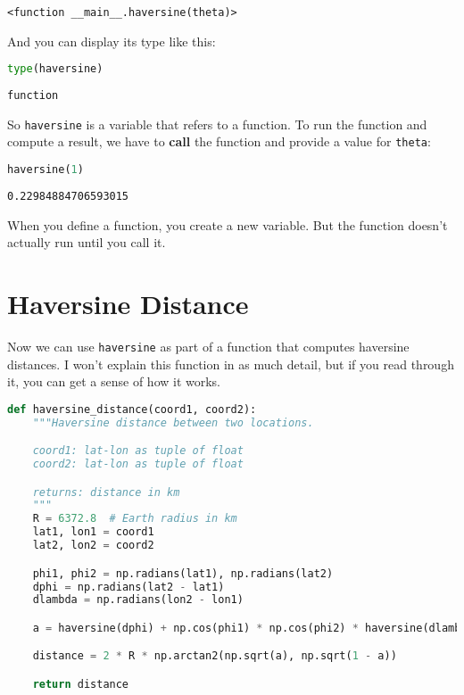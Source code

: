 \begin{lstlisting}[style=output]
<function __main__.haversine(theta)>
\end{lstlisting}

And you can display its type like this:

\begin{lstlisting}[language=Python,style=source]
type(haversine)
\end{lstlisting}

\begin{lstlisting}[style=output]
function
\end{lstlisting}

So \passthrough{\lstinline!haversine!} is a variable that refers to a
function. To run the function and compute a result, we have to
\textbf{call} the function and provide a value for
\passthrough{\lstinline!theta!}:

\begin{lstlisting}[language=Python,style=source]
haversine(1)
\end{lstlisting}

\begin{lstlisting}[style=output]
0.22984884706593015
\end{lstlisting}

When you define a function, you create a new variable. But the function
doesn't actually run until you call it.

\section{Haversine Distance}\label{haversine-distance}

Now we can use \passthrough{\lstinline!haversine!} as part of a function
that computes haversine distances. I won't explain this function in as
much detail, but if you read through it, you can get a sense of how it
works.

\begin{lstlisting}[language=Python,style=source]
def haversine_distance(coord1, coord2):
    """Haversine distance between two locations.

    coord1: lat-lon as tuple of float
    coord2: lat-lon as tuple of float

    returns: distance in km
    """
    R = 6372.8  # Earth radius in km
    lat1, lon1 = coord1
    lat2, lon2 = coord2

    phi1, phi2 = np.radians(lat1), np.radians(lat2)
    dphi = np.radians(lat2 - lat1)
    dlambda = np.radians(lon2 - lon1)

    a = haversine(dphi) + np.cos(phi1) * np.cos(phi2) * haversine(dlambda)

    distance = 2 * R * np.arctan2(np.sqrt(a), np.sqrt(1 - a))

    return distance
\end{lstlisting}

